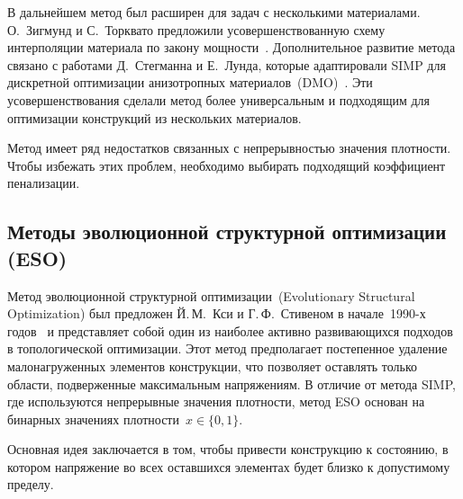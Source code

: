 В дальнейшем метод был расширен для задач с несколькими материалами. О.~Зигмунд и С.~Торквато предложили усовершенствованную схему интерполяции материала по закону мощности~\cite{Sigmund1997}. Дополнительное развитие метода связано с работами Д.~Стегманна и Е.~Лунда, которые адаптировали SIMP для дискретной оптимизации анизотропных материалов~(DMO)~\cite{Stegmann2005, Lund2006}. Эти усовершенствования сделали метод более универсальным и подходящим для оптимизации конструкций из нескольких материалов.

Метод имеет ряд недостатков связанных с непрерывностью значения плотности. Чтобы избежать этих проблем, необходимо выбирать подходящий коэффициент пенализации.



\subsection{Методы эволюционной структурной оптимизации (ESO)}

Метод эволюционной структурной оптимизации~(Evolutionary Structural Optimization) был предложен Й.\,М.~Кси и Г.\,Ф.~Стивеном в начале~1990-х годов~\cite{Xie1993,Xie1997} и представляет собой один из наиболее активно развивающихся подходов в топологической оптимизации. 
Этот метод предполагает постепенное удаление малонагруженных элементов конструкции, что позволяет оставлять только области, подверженные максимальным напряжениям. 
В отличие от метода SIMP, где используются непрерывные значения плотности, метод ESO основан на бинарных значениях плотности~$x\in\{0,1\}$.

Основная идея заключается в том, чтобы привести конструкцию к состоянию, в котором напряжение во всех оставшихся элементах будет близко к допустимому пределу.           

